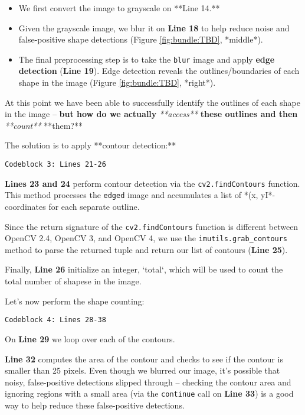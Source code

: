 \begin{itemize}
    \item We first convert the image to grayscale on **Line 14.**
    \item Given the grayscale image, we blur it on \textbf{Line 18} to help reduce noise and false-positive shape detections (Figure \ref{fig:bundle:TBD}, *middle*).
    \item The final preprocessing step is to take the \texttt{blur} image and apply \textbf{edge detection} (\textbf{Line 19}). Edge detection reveals the outlines/boundaries of each shape in the image (Figure \ref{fig:bundle:TBD}, *right*).
\end{itemize}

At this point we have been able to successfully identify the outlines of each shape in the image -- \textbf{but how do we actually} \textit{**access**} \textbf{these outlines and then} \textit{**count**} **them?**

The solution is to apply **contour detection:**

\begin{verbatim}
Codeblock 3: Lines 21-26
\end{verbatim}

\textbf{Lines 23 and 24} perform contour detection via the \texttt{cv2.findContours} function. This method processes the \texttt{edged} image and accumulates a list of *(x, yI*-coordinates for each separate outline.

Since the return signature of the \texttt{cv2.findContours} function is different between OpenCV 2.4, OpenCV 3, and OpenCV 4, we use the \texttt{imutils.grab_contours} method to parse the returned tuple and return our list of contours (\textbf{Line 25}).

Finally, \textbf{Line 26} initialize an integer, `total`, which will be used to count the total number of shapese in the image.

Let’s now perform the shape counting:

\begin{verbatim}
Codeblock 4: Lines 28-38
\end{verbatim}

On \textbf{Line 29} we loop over each of the contours.

\textbf{Line 32} computes the area of the contour and checks to see if the contour is smaller than 25 pixels. Even though we blurred our image, it’s possible that noisy, false-positive detections slipped through -- checking the contour area and ignoring regions with a small area (via the \texttt{continue} call on \textbf{Line 33}) is a good way to help reduce these false-positive detections.

